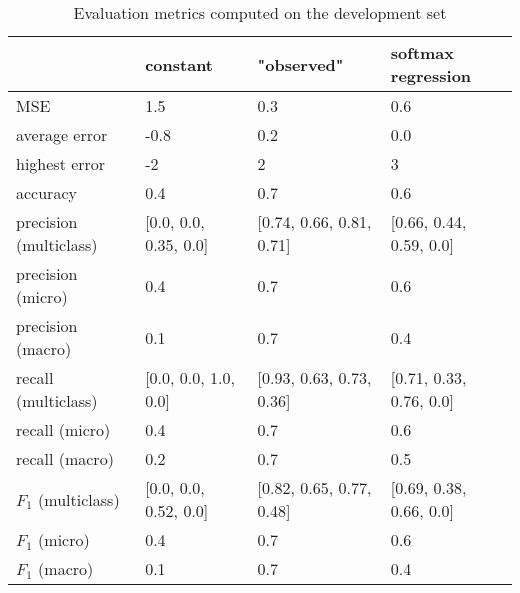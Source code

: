 \begin{table}[H]
\caption{Evaluation metrics computed on the development set}
\label{tbl:sais_eval_development}
\begin{tabular}{llll}
\toprule
 & constant & "observed" & softmax regression \\
\midrule
MSE & 1.5 & 0.3 & 0.6 \\
average error & -0.8 & 0.2 & 0.0 \\
highest error & -2 & 2 & 3 \\
accuracy & 0.4 & 0.7 & 0.6 \\
precision (multiclass) & [0.0, 0.0, 0.35, 0.0] & [0.74, 0.66, 0.81, 0.71] & [0.66, 0.44, 0.59, 0.0] \\
precision (micro) & 0.4 & 0.7 & 0.6 \\
precision (macro) & 0.1 & 0.7 & 0.4 \\
recall (multiclass) & [0.0, 0.0, 1.0, 0.0] & [0.93, 0.63, 0.73, 0.36] & [0.71, 0.33, 0.76, 0.0] \\
recall (micro) & 0.4 & 0.7 & 0.6 \\
recall (macro) & 0.2 & 0.7 & 0.5 \\
$F_1$ (multiclass) & [0.0, 0.0, 0.52, 0.0] & [0.82, 0.65, 0.77, 0.48] & [0.69, 0.38, 0.66, 0.0] \\
$F_1$ (micro) & 0.4 & 0.7 & 0.6 \\
$F_1$ (macro) & 0.1 & 0.7 & 0.4 \\
\bottomrule
\end{tabular}
\end{table}
